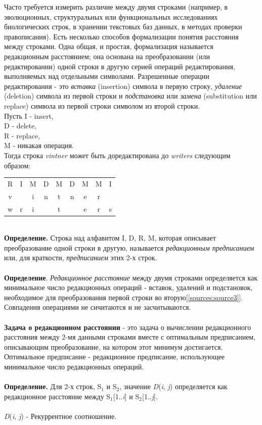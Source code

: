 \documentclass[a4paper,12pt]{article}
\begin{document}
Часто требуется измерить различие между двумя строками (например, в эволюционных, структуральных или функциональных исследованиях биологических строк, в хранении текстовых баз данных, в методах проверки правописания). Есть несколько способов формализации понятия расстояния между строками. Одна общая, и простая, формализация называется редакционным расстоянием; она основана на преобразовании (или редактировании) одной строки в другую серией операций редактирования, выполняемых над отдельными символами. Разрешенные операции редактирования - это \textit{вставка} (insertion) символа в первую строку, \textit{удаление} (deletion) символа из первой строки и \textit{подстановка} или \textit{замена} (substitution или replace) символа из первой строки символом из второй строки. \\
Пусть I - insert, \\
D - delete, \\
R - replace, \\
M - никакая операция. \\
Тогда строка \textit{vintner} может быть доредактирована до \textit{writers} следующим образом: \\
\begin{table}[h]
\begin{center}
\begin{tabular}{ccccccccc}
R & I & M & D & M & D & M & M & I \\
v & & i & n & t & n & e & r & \\
w & r & i & & t & & e & r & s \\
\end{tabular}
\end{center}
\end{table}
\\
\textbf{Определение.} Строка над алфавитом I, D, R, M, которая описывает преобразование одной строки в другую, называется \textit{редакционным предписанием} или, для краткости, \textit{предписанием} этих 2-х строк. \\
\\
\textbf{Определение}. \textit{Редакционное расстояние} между двумя строками определяется как минимальное число редакционных операций - вставок, удалений и подстановок, необходимое для преобразования первой строки во вторую[\ref{sources:source3}]. Совпадения операциями не сичитаются и не засчитываются. \\
\\
\textbf{Задача о редакционном расстоянии} - это задача о вычислении редакционного расстояния между 2-мя данными строками вместе с оптимальным  предписанием, описывающим преобразование, на котором этот минимум достигается. Оптимальное предписание - редакционное предписание, использующее минимальное число редакционных операций. \\
\\
\textbf{Определение.} Для 2-х строк, S$_1$ и S$_2$, значение \textit{D}(\textit{i}, \textit{j}) определяется как редакционное	расстояние между S$_1$[1..\textit{i}] и S$_2$[1..\textit{j}]. \\
\\
\textit{D}(\textit{i}, \textit{j}) - Рекуррентное соотношение. \\
\end{document}
